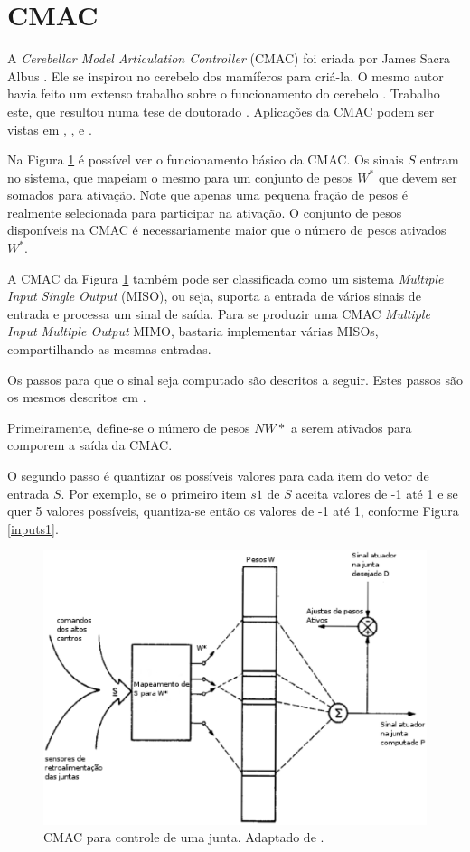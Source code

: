 \section[CMAC]{CMAC}
\label{cmac_sec}

A \emph{Cerebellar Model Articulation Controller} (CMAC) foi criada por James Sacra Albus \cite{Albus1975b}. 
Ele se inspirou no cerebelo dos mamíferos para criá-la. 
O mesmo autor havia feito um extenso trabalho sobre o funcionamento do cerebelo \cite{Albus1971b}.
Trabalho este, que resultou numa tese de doutorado \cite{Albus1972a}.
Aplicações da CMAC podem ser vistas em \cite{Albus1975d}, \cite{Albus1979}, \cite{Sabourin2006a} e \cite{Lin2002a}.

Na Figura \ref{fig1} é possível ver o funcionamento básico da CMAC. Os sinais $S$ entram no sistema, que mapeiam o mesmo para um conjunto de pesos $W^*$ que devem ser somados para ativação. 
Note que apenas uma pequena fração de pesos é realmente selecionada para participar na ativação. 
O conjunto de pesos disponíveis na CMAC é necessariamente maior que o número de pesos ativados $W^*$. 

A CMAC da Figura \ref{fig1} também pode ser classificada como um sistema \emph{Multiple Input Single Output} (MISO), ou seja, suporta a entrada de vários sinais de entrada e processa um sinal de saída.
Para se produzir uma CMAC \emph{Multiple Input Multiple Output} MIMO, bastaria implementar várias MISOs, compartilhando as mesmas entradas.


Os passos para que o sinal seja computado são descritos a seguir. Estes passos são os mesmos descritos em .

Primeiramente, define-se o número de pesos $NW*$ a serem ativados para comporem a saída da CMAC.

O segundo passo é quantizar os possíveis valores para cada item do vetor de entrada $S$.
Por exemplo, se o primeiro item $s1$ de $S$ aceita valores de -1 até 1 e se quer 5 valores possíveis, quantiza-se então os valores de -1 até 1, conforme Figura \ref{inputs1}.

\begin{figure}[ht]
	\centering
	\includegraphics[width=15 cm]{figuras/cmac1.eps}
	\caption{CMAC para controle de uma junta. Adaptado de \cite{Albus1975b}.}
    	\label{fig1}
\end{figure}


